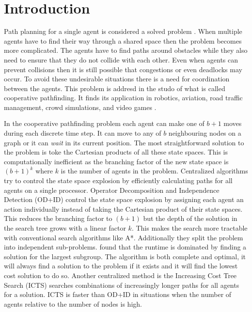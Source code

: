\section{Introduction}\label{sec:intro}
Path planning for a single agent is considered a solved problem
\citep{sharon2013}. When multiple agents have to find their way through a
shared
space then the problem becomes more complicated. The agents have to find paths
around obstacles while they also need to ensure that they do not collide with
each other. Even when agents can prevent collisions then it is still possible
that congestions or even deadlocks may occur. To avoid these undesirable
situations there is a need for coordination between the agents. This problem is
addresd in the studo of what is called cooperative pathfinding. It finds its
application in robotics, aviation, road traffic management, crowd simulations,
and video games \citep{standley2011}.

In the cooperative pathfinding problem each agent can make one of $b+1$ moves 
during each discrete time step. It can move to any of $b$ neighbouring nodes on 
a graph or it can \emph{wait} in its current position. The most straightforward 
solution to the problem is toke the Cartesian products of all these state 
spaces. This is computationally inefficient \citep{hopcroft1984,sharon2013} as 
the branching factor of the new state space is $(b+1)^k$ where $k$ is the 
number of agents in the problem. Centralized algorithms try to control the 
state space explosion by efficiently calculating paths for all agents on a 
single processor. Operator Decomposition and Independence Detection (OD+ID) 
\citep{standley2010,standley2011} control the state space explosion by 
assigning each agent an action individually instead of taking the Cartesian 
product of their state spaces. This reduces the branching factor to $(b+1)$ but 
the depth of the solution in the search tree grows with a linear factor $k$. 
This makes the search more tractable with conventional search algorithms like 
A*. Additionally they split the problem into independent sub-problems. 
\cite{standley2010} found that the runtime is dominated by finding a solution 
for the largest subgroup. The algorithm is both complete and optimal, it will 
always find a solution to the problem if it exists and it will find the lowest 
cost solution to do so. Another centralized method is the Increasing Cost Tree 
Search (ICTS) \citep{sharon2013} searches combinations of increasingly longer 
paths for all agents for a solution. ICTS is faster than OD+ID in situations 
when the number of agents relative to the number of nodes is high.

